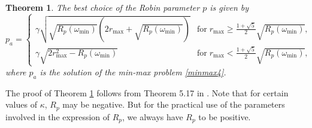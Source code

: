 \documentclass[11pt]{article}
\newtheorem{theorem}{Theorem}[section]
\begin{document}
\begin{theorem}\label{thm_robinpara}
The best choice of the Robin parameter $p$ is given by 
\begin{equation*}
p_a= \begin{cases}
\gamma\sqrt{\sqrt{R_p(\omega_{\min})}\left(2r_{\max} + \sqrt{R_p(\omega_{\min})} \right)} &\text{for}\; r_{\max}\geq \frac{1+\sqrt{5}}{2}\sqrt{R_p(\omega_{\min})},\\
\gamma \sqrt{2r_{\max}^2 - R_p(\omega_{\min})} &\text{for}\; r_{\max}< \frac{1+\sqrt{5}}{2}\sqrt{R_p(\omega_{\min})},
\end{cases}
\end{equation*}
where $p_a$ is the solution of the min-max problem \eqref{minmax4}.
\end{theorem}
The proof of Theorem \ref{thm_robinpara} follows from Theorem 5.17 in \cite{gander2007optimized}. Note that for certain values of $\kappa$, $R_p$ may be negative. But for the practical use of the parameters involved in the expression of $R_p$, we always have $R_p$ to be positive.
\end{document}
